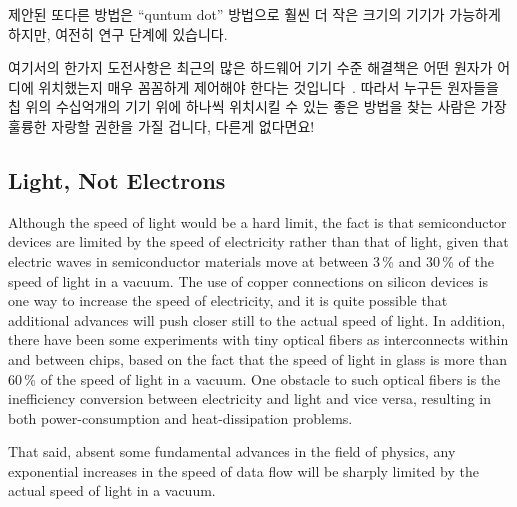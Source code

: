\fi

제안된 또다른 방법은 ``quntum dot'' 방법으로 훨씬 더 작은 크기의 기기가
가능하게 하지만, 여전히 연구 단계에 있습니다.

여기서의 한가지 도전사항은 최근의 많은 하드웨어 기기 수준 해결책은 어떤 원자가
어디에 위치했는지 매우 꼼꼼하게 제어해야 한다는
것입니다~\cite{MichaelJKelly2017DeviceLevel}.
따라서 누구든 원자들을 칩 위의 수십억개의 기기 위에 하나씩 위치시킬 수 있는
좋은 방법을 찾는 사람은 가장 훌륭한 자랑할 권한을 가질 겁니다, 다른게 없다면요!

\iffalse

Another proposed workaround is the ``quantum dot'' approach that
allows much smaller device sizes, but which is still in the research
stage.

One challenge is that many recent hardware-device-level breakthroughs
require very tight control of which atoms are placed
where~\cite{MichaelJKelly2017DeviceLevel}.
It therefore seems likely that whoever finds a good way to hand-place
atoms on each of the billions of devices on a chip will have most
excellent bragging rights, if nothing else!

\fi

\subsection{Light, Not Electrons}
\label{sec:cpu:Light, Not Electrons}

Although the speed of light would be a hard limit, the fact is that
semiconductor devices are limited by the speed of electricity rather
than that of light, given that electric waves in semiconductor materials
move at between 3\,\% and 30\,\% of the speed of light in a vacuum.
The use of copper connections on silicon devices is one way to increase
the speed of electricity, and it is quite possible that additional
advances will push closer still to the actual speed of light.
In addition, there have been some experiments with tiny optical fibers
as interconnects within and between chips, based on the fact that
the speed of light in glass is more than 60\,\% of the speed of light
in a vacuum.
One obstacle to such optical fibers is the inefficiency conversion
between electricity and light and vice versa, resulting in both
power-consumption and heat-dissipation problems.

That said, absent some fundamental advances in the field of physics,
any exponential increases in the speed of data flow
will be sharply limited by the actual speed of light in a vacuum.

